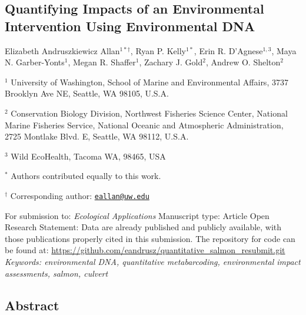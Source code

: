 \documentclass[
]{article}
\author{}
\date{\vspace{-2.5em}}
\begin{document}
\hypertarget{quantifying-impacts-of-an-environmental-intervention-using-environmental-dna}{%
\subsection{Quantifying Impacts of an Environmental Intervention Using
Environmental
DNA}\label{quantifying-impacts-of-an-environmental-intervention-using-environmental-dna}}

Elizabeth Andruszkiewicz Allan\(^{1*\dagger}\), Ryan P. Kelly\(^{1*}\),
Erin R. D'Agnese\(^{1,3}\), Maya N. Garber-Yonts\(^{1}\), Megan R.
Shaffer\(^{1}\), Zachary J. Gold\(^{2}\), Andrew O. Shelton\(^{2}\)

\(^{1}\) University of Washington, School of Marine and Environmental
Affairs, 3737 Brooklyn Ave NE, Seattle, WA 98105, U.S.A.

\(^2\) Conservation Biology Division, Northwest Fisheries Science
Center, National Marine Fisheries Service, National Oceanic and
Atmospheric Administration, 2725 Montlake Blvd. E, Seattle, WA 98112,
U.S.A.

\(^3\) Wild EcoHealth, Tacoma WA, 98465, USA

\vspace{1em}

\(^{*}\) Authors contributed equally to this work.

\(^{\dagger}\) Corresponding author:
\href{mailto:eallan@uw.edu}{\nolinkurl{eallan@uw.edu}} \vspace{1em}

For submission to: \textit{Ecological Applications} \newline Manuscript
type: Article \newline Open Research Statement: Data are already
published and publicly available, with those publications properly cited
in this submission. The repository for code can be found at:
\newline  \url{https://github.com/eandrusz/quantitative_salmon_resubmit.git}
\newline \textit{Keywords: environmental DNA, quantitative metabarcoding, environmental impact assessments, salmon, culvert}

\newpage

\hypertarget{abstract}{%
\subsection{Abstract}\label{abstract}}
\end{document}
